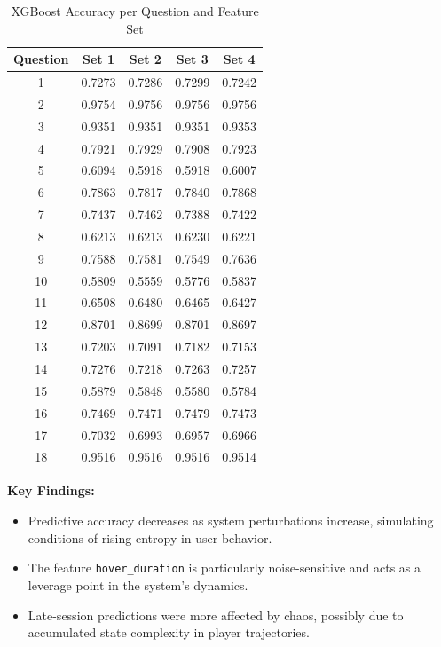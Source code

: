 \documentclass[12pt]{article}
\begin{document}
	\begin{table}[H]
		\centering
		\small
		\caption{XGBoost Accuracy per Question and Feature Set}
		\begin{tabular}{c|cccc}
			\toprule
			\textbf{Question} & \textbf{Set 1} & \textbf{Set 2} & \textbf{Set 3} & \textbf{Set 4} \\
			\midrule
			1  & 0.7273 & 0.7286 & 0.7299 & 0.7242 \\
			2  & 0.9754 & 0.9756 & 0.9756 & 0.9756 \\
			3  & 0.9351 & 0.9351 & 0.9351 & 0.9353 \\
			4  & 0.7921 & 0.7929 & 0.7908 & 0.7923 \\
			5  & 0.6094 & 0.5918 & 0.5918 & 0.6007 \\
			6  & 0.7863 & 0.7817 & 0.7840 & 0.7868 \\
			7  & 0.7437 & 0.7462 & 0.7388 & 0.7422 \\
			8  & 0.6213 & 0.6213 & 0.6230 & 0.6221 \\
			9  & 0.7588 & 0.7581 & 0.7549 & 0.7636 \\
			10 & 0.5809 & 0.5559 & 0.5776 & 0.5837 \\
			11 & 0.6508 & 0.6480 & 0.6465 & 0.6427 \\
			12 & 0.8701 & 0.8699 & 0.8701 & 0.8697 \\
			13 & 0.7203 & 0.7091 & 0.7182 & 0.7153 \\
			14 & 0.7276 & 0.7218 & 0.7263 & 0.7257 \\
			15 & 0.5879 & 0.5848 & 0.5580 & 0.5784 \\
			16 & 0.7469 & 0.7471 & 0.7479 & 0.7473 \\
			17 & 0.7032 & 0.6993 & 0.6957 & 0.6966 \\
			18 & 0.9516 & 0.9516 & 0.9516 & 0.9514 \\
			\bottomrule
		\end{tabular}
		\label{tab:xgb_metrics}
	\end{table}



\noindent \textbf{Key Findings:}
\begin{itemize}
	\item Predictive accuracy decreases as system perturbations increase, simulating conditions of rising entropy in user behavior.
	\item The feature \texttt{hover\_duration} is particularly noise-sensitive and acts as a leverage point in the system's dynamics.
	\item Late-session predictions were more affected by chaos, possibly due to accumulated state complexity in player trajectories.
\end{itemize}
	
\end{document}
